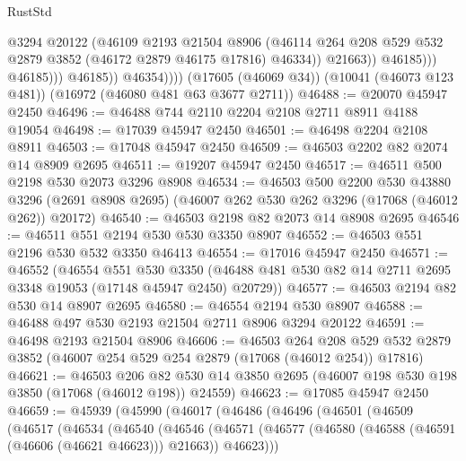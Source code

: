 \begin{lexlean}{RustStd}
\begin{coremodule}
                                @3294
                                @20122
                                (@46109
                                  @2193
                                  @21504
                                  @8906
                                  (@46114
                                    @264
                                    @208
                                    @529
                                    @532
                                    @2879
                                    @3852
                                    (@46172 @2879 @46175 @17816)
                                    @46334))
                                @21663))
                            @46185)))
                      @46185)))
                @46185))
            @46354))))
    (@17605 (@46069 @34))
    (@10041 (@46073 @123 @481))
    (@16972 (@46080 @481 @63 @3677 @2711))
@46488 := @20070 @45947 @2450
@46496 := @46488 @744 @2110 @2204 @2108 @2711 @8911 @4188 @19054
@46498 := @17039 @45947 @2450
@46501 := @46498 @2204 @2108 @8911
@46503 := @17048 @45947 @2450
@46509 := @46503 @2202 @82 @2074 @14 @8909 @2695
@46511 := @19207 @45947 @2450
@46517 := @46511 @500 @2198 @530 @2073 @3296 @8908
@46534 := @46503
    @500
    @2200
    @530
    @43880
    @3296
    (@2691 @8908 @2695)
    (@46007 @262 @530 @262 @3296 (@17068 (@46012 @262)) @20172)
@46540 := @46503 @2198 @82 @2073 @14 @8908 @2695
@46546 := @46511 @551 @2194 @530 @530 @3350 @8907
@46552 := @46503 @551 @2196 @530 @532 @3350 @46413
@46554 := @17016 @45947 @2450
@46571 := @46552
    (@46554
      @551
      @530
      @3350
      (@46488 @481 @530 @82 @14 @2711 @2695 @3348 @19053 (@17148 @45947 @2450) @20729))
@46577 := @46503 @2194 @82 @530 @14 @8907 @2695
@46580 := @46554 @2194 @530 @8907
@46588 := @46488 @497 @530 @2193 @21504 @2711 @8906 @3294 @20122
@46591 := @46498 @2193 @21504 @8906
@46606 := @46503
    @264
    @208
    @529
    @532
    @2879
    @3852
    (@46007 @254 @529 @254 @2879 (@17068 (@46012 @254)) @17816)
@46621 := @46503
    @206
    @82
    @530
    @14
    @3850
    @2695
    (@46007 @198 @530 @198 @3850 (@17068 (@46012 @198)) @24559)
@46623 := @17085 @45947 @2450
@46659 := @45939
    (@45990
      (@46017
        (@46486
          (@46496
            (@46501
              (@46509
                (@46517
                  (@46534
                    (@46540
                      (@46546
                        (@46571
                          (@46577
                            (@46580 (@46588 (@46591 (@46606 (@46621 @46623))) @21663))
                            @46623)))

\end{coremodule}
\end{lexlean}

